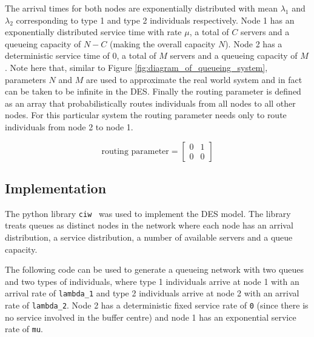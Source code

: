 The arrival times for both nodes are exponentially distributed with
mean \(\lambda_1\) and \(\lambda_2\) corresponding to type 1 and type 2
individuals respectively.
Node 1 has an exponentially distributed service time with rate \(\mu\),
a total of \(C\) servers and a queueing capacity of \(N - C\) (making the
overall capacity \(N\)). 
Node 2 has a deterministic service time of \(0\), a total of \(M\)
servers and a queueing capacity of \(M\).
Note here that, similar to Figure \ref{fig:diagram_of_queueing_system},
parameters \(N\) and \(M\) are used to approximate the real world system 
and in fact can be taken to be infinite in the DES.
Finally the routing parameter is defined as an array that probabilistically
routes individuals from all nodes to all other nodes.
For this particular system the routing parameter needs only to route individuals
from node 2 to node 1.

\begin{equation}
    \text{routing parameter} = \left[
    \begin{array}{cc}
        0 & 1 \\
        0 & 0
    \end{array}
    \right]
\end{equation}


\subsection{Implementation}
The python library \texttt{ciw}~\cite{ciwpython, ciwarticle}
was used to implement the DES model.
The library treats queues as distinct nodes in the network where each node has
an arrival distribution, a service distribution, a number of available servers
and a queue capacity.

The following code can be used to generate a queueing network with two
queues and two types of individuals, where type 1 individuals arrive at node
1 with an arrival rate of \texttt{lambda\_1} and type 2
individuals arrive at node 2 with an arrival rate of
\texttt{lambda\_2}.
Node 2 has a deterministic fixed service rate of
\texttt{0} (since there is no service involved in the buffer
centre) and node 1 has an exponential service rate of
\texttt{mu}.

